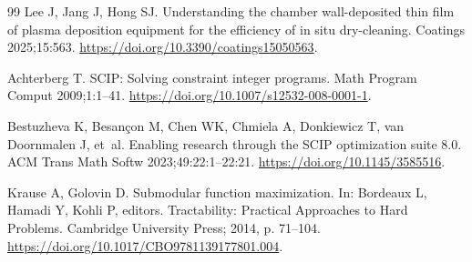 \documentclass[final,5p,times,twocolumn]{elsarticle}
\begin{document}
\begin{thebibliography}{99}
Lee J, Jang J, Hong SJ. Understanding the chamber wall-deposited thin film of plasma deposition equipment for the efficiency of in situ dry-cleaning. Coatings 2025;15:563. \url{https://doi.org/10.3390/coatings15050563}.

Achterberg T. {SCIP}: Solving constraint integer programs.
Math Program Comput 2009;1:1--41.
\url{https://doi.org/10.1007/s12532-008-0001-1}.

Bestuzheva K, Besan{\c{c}}on M, Chen WK, Chmiela A, Donkiewicz T, van Doornmalen J, et~al. Enabling research through the {SCIP} optimization suite 8.0.
ACM Trans Math Softw 2023;49:22:1--22:21.
\url{https://doi.org/10.1145/3585516}.

Krause A, Golovin D. Submodular function maximization.
In: Bordeaux L, Hamadi Y, Kohli P, editors. Tractability: Practical Approaches to Hard Problems. Cambridge University Press; 2014, p. 71--104.
\url{https://doi.org/10.1017/CBO9781139177801.004}.
\end{thebibliography}
\end{document}
